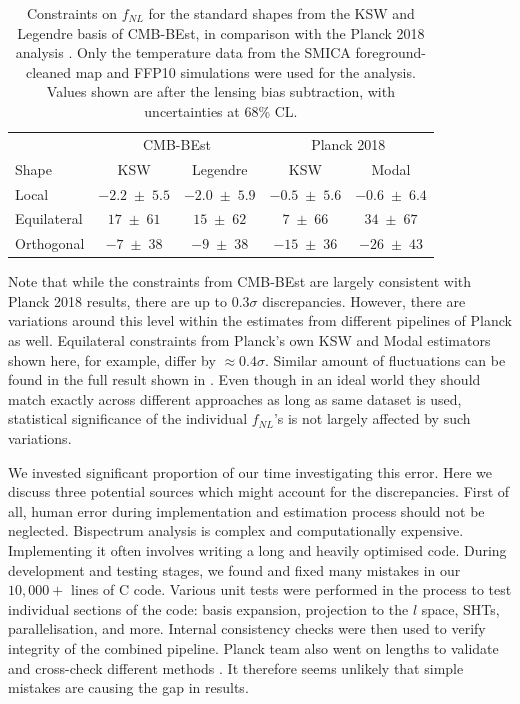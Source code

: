 \begin{table}[h]
	\caption{Constraints on $f_{NL}$ for the standard shapes from the KSW and Legendre basis of CMB-BEst, in comparison with the Planck 2018 analysis \cite{PlanckCollaboration2018}. Only the temperature data from the SMICA foreground-cleaned map and FFP10 simulations were used for the analysis. Values shown are after the lensing bias subtraction, with uncertainties at 68\% CL.}
	\centering
	\label{table:trio_fNL_comparison_with_planck}
	\renewcommand{\arraystretch}{1.5} 
	\begin{tabular}{lcccc}
		\toprule
		& \multicolumn{2}{c}{CMB-BEst} & \multicolumn{2}{c}{Planck 2018} \\ \cmidrule(lr){2-3} \cmidrule(lr){4-5}
		Shape & KSW &  Legendre &  KSW &  Modal \\
		\midrule
		
		Local & $-2.2 \;\pm\; 5.5$ & $-2.0 \;\pm\; 5.9$ & $-0.5 \;\pm\; 5.6$ & $-0.6 \;\pm\; 6.4$ \\
		Equilateral & $17 \;\pm\; 61$ & $15 \;\pm\; 62$ & $7 \;\pm\; 66$ & $34 \;\pm\; 67$ \\
		Orthogonal & $-7 \;\pm\; 38$ & $-9 \;\pm\; 38$ & $-15 \;\pm\; 36$ & $-26 \;\pm\; 43$ \\
		\bottomrule
	\end{tabular}
\end{table}

Note that while the constraints from CMB-BEst are largely consistent with Planck 2018 results, there are up to $0.3\sigma$ discrepancies. However, there are variations around this level within the estimates from different pipelines of Planck as well. Equilateral constraints from Planck's own KSW and Modal estimators shown here, for example, differ by $\approx 0.4\sigma$. Similar amount of fluctuations can be found in the full result shown in \cite{PlanckCollaboration2018}. Even though in an ideal world they should match exactly across different approaches as long as same dataset is used, statistical significance of the individual $f_{NL}$'s is not largely affected by such variations.

We invested significant proportion of our time investigating this error. Here we discuss three potential sources which might account for the discrepancies. First of all, human error during implementation and estimation process should not be neglected. Bispectrum analysis is complex and computationally expensive. Implementing it often involves writing a long and heavily optimised code. During development and testing stages, we found and fixed many mistakes in our $10,000+$ lines of \textsc{C} code. Various unit tests were performed in the process to test individual sections of the code: basis expansion, projection to the $l$ space, SHTs, parallelisation, and more. Internal consistency checks were then used to verify integrity of the combined pipeline. Planck team also went on lengths to validate and cross-check different methods \cite{PlanckCollaboration2013}. It therefore seems unlikely that simple mistakes are causing the gap in results.

